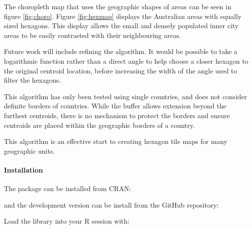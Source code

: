 The choropleth map that uses the geographic shapes of areas can be seen
in figure \ref{fig:choro}. Figure \ref{fig:hexmap} displays the
Australian areas with equally sized hexagons. This display allows the
small and densely populated inner city areas to be easily contrasted
with their neighbouring areas.

Future work will include refining the algorithm. It would be possible to
take a logarithmic function rather than a direct angle to help choose a
closer hexagon to the original centroid location, before increasing the
width of the angle used to filter the hexagons.

This algorithm has only been tested using single countries, and does not
consider definite borders of countries. While the buffer allows
extension beyond the furthest centroids, there is no mechanism to
protect the borders and ensure centroids are placed within the
geographic borders of a country.

This algorithm is an effective start to creating hexagon tile maps for
many geographic units.

\hypertarget{installation}{%
\paragraph{Installation}\label{installation}}

The package can be installed from CRAN:

and the development version can be install from the GitHub repository:

Load the library into your R session with:



\address{%
Stephanie Kobakian\\
Monash University\\%
Department of Econometrics and Business Statistics\\
%
%
%
\\\href{mailto:stephanie.kobakian@monash.edu}{\nolinkurl{stephanie.kobakian@monash.edu}}
}

\address{%
Dianne Cook\\
Monash University\\%
Department of Econometrics and Business Statistics\\
%
%
%
\\\href{mailto:dicook@monash.edu}{\nolinkurl{dicook@monash.edu}}
}
